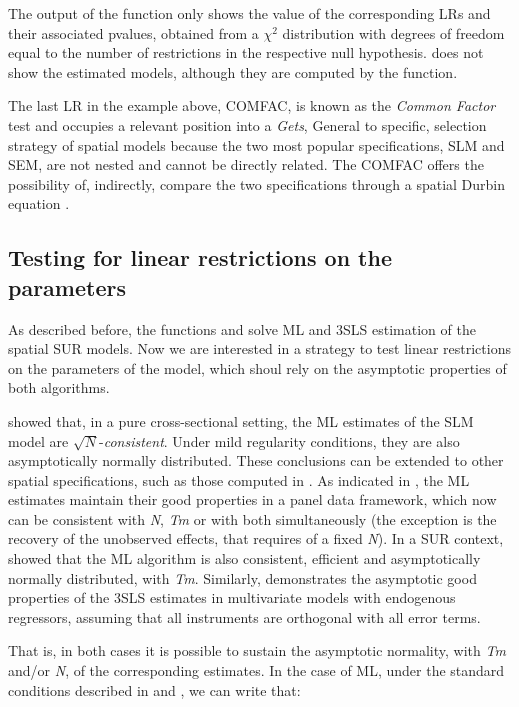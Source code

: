\documentclass[article]{jss}
\begin{document}
The output of the function only shows the value of the corresponding LRs and their associated pvalues, obtained from a \(\chi^2\) distribution with degrees of freedom equal to the number of restrictions in the respective null hypothesis.  does not show the estimated models, although they are computed by the function.

The last LR in the example above, COMFAC, is known as the \emph{Common Factor} test and occupies a relevant position into a \emph{Gets}, General to specific, selection strategy of spatial models because the two most popular specifications, SLM and SEM, are not nested and cannot be directly related. The COMFAC offers the possibility of, indirectly, compare the two specifications through a spatial Durbin equation \citep{Mur2006}.

\hypertarget{linear}{%
\subsection{Testing for linear restrictions on the parameters}\label{linear}}

As described before, the functions  and  solve ML and 3SLS estimation of the spatial SUR models. Now we are interested in a strategy to test linear restrictions on the parameters of the model, which shoul rely on the asymptotic properties of both algorithms.

\citet{Lee2004} showed that, in a pure cross-sectional setting, the ML estimates of the SLM model are \(\sqrt{N}\)-\emph{consistent}. Under mild regularity conditions, they are also asymptotically normally distributed. These conclusions can be extended to other spatial specifications, such as those computed in . As indicated in \citet{Elhorst2014}, the ML estimates maintain their good properties in a panel data framework, which now can be consistent with \emph{N}, \emph{Tm} or with both simultaneously (the exception is the recovery of the unobserved effects, that requires of a fixed \emph{N}). In a SUR context, \citet{Kmenta1974} showed that the ML algorithm is also consistent, efficient and asymptotically normally distributed, with \emph{Tm}. Similarly, \citet{Schmidt1990} demonstrates the asymptotic good properties of the 3SLS estimates in multivariate models with endogenous regressors, assuming that all instruments are orthogonal with all error terms.

That is, in both cases it is possible to sustain the asymptotic normality, with \emph{Tm} and/or \emph{N}, of the corresponding estimates. In the case of ML, under the standard conditions described in \citet{Lee2004} and \citet{Elhorst2014}, we can write that:
\end{document}
